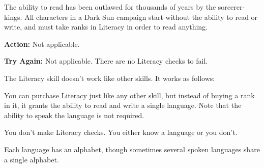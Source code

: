 The ability to read has been outlawed for thousands of years by the sorcerer-kings. All characters in a {\tableheader Dark Sun} campaign start without the ability to read or write, and must take ranks in Literacy in order to read anything.

\textbf{Action:} Not applicable.

\textbf{Try Again:} Not applicable. There are no Literacy checks to fail.

The Literacy skill doesn't work like other skills. It works as follows:

\begin{itemize*}
\item You can purchase Literacy just like any other skill, but instead of buying a rank in it, it grants the ability to read and write a single language. Note that the ability to speak the language is not required.
\item You don't make Literacy checks. You either know a language or you don't.
\item Each language has an alphabet, though sometimes several spoken languages share a single alphabet.
\end{itemize*}

